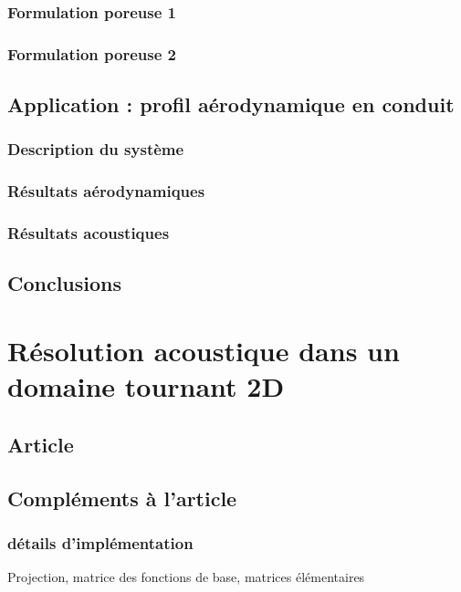         \subsection{Formulation poreuse 1}
            
        \subsection{Formulation poreuse 2}
            
    \section{Application : profil aérodynamique en conduit}
        \subsection{Description du système}
            
        \subsection{Résultats aérodynamiques}
            
            \clearpage 
        \subsection{Résultats acoustiques}
            
    \section{Conclusions}
        



\chapter{Résolution acoustique dans un domaine tournant 2D}
    \label{section:chap2D}
    \section{Article }
    \section{Compléments à l'article}
        \subsection{détails d'implémentation}
        Projection, matrice des fonctions de base, matrices élémentaires 
